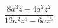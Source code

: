 \begin{ex}[type=expression]
	\begin{condition}
		\(\dfrac{8a^3z-4a^2z^2}{12a^2z^4-6az^5}\)
	\end{condition}
\end{ex}